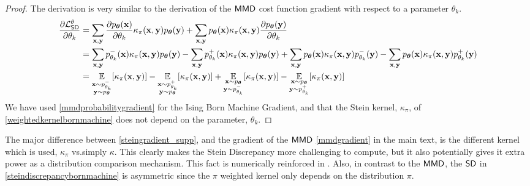 \begin{proof}
The derivation is very similar to the derivation of the $\operatorname{\textsf{MMD}}$ cost function gradient with respect to a parameter $\theta_k$.
\begin{align*}
    \frac{\partial \mathcal{L}^{\theta}_{\operatorname{\textsf{SD}}}}{\partial \theta_k} &= \sum\limits_{\mathbf{x}, \mathbf{y}} \frac{\partial p_{\boldsymbol\theta}(\mathbf{x})}{\partial \theta_k} \kappa_\pi(\mathbf{x}, \mathbf{y}) p_{\boldsymbol\theta}(\mathbf{y}) +  \sum\limits_{\mathbf{x}, \mathbf{y}} p_{\boldsymbol\theta}(\mathbf{x})\kappa_\pi(\mathbf{x}, \mathbf{y})   \frac{\partial p_{\boldsymbol\theta}(\mathbf{y})}{\partial \theta_k}\\
    &=  \sum\limits_{\mathbf{x}, \mathbf{y}}p^-_{\theta_k}(\mathbf{x})  \kappa_\pi(\mathbf{x}, \mathbf{y}) p_{\boldsymbol\theta}(\mathbf{y}) -  \sum\limits_{\mathbf{x}, \mathbf{y}}p^+_{\theta_k}(\mathbf{x})  \kappa_\pi(\mathbf{x}, \mathbf{y}) p_{\boldsymbol\theta}(\mathbf{y}) +\sum\limits_{\mathbf{x}, \mathbf{y}} p_{\boldsymbol\theta}(\mathbf{x})\kappa_\pi(\mathbf{x}, \mathbf{y})   p^-_{\theta_k}(\mathbf{y}) -  \sum\limits_{\mathbf{x}, \mathbf{y}} p_{\boldsymbol\theta}(\mathbf{x})\kappa_\pi(\mathbf{x}, \mathbf{y})p^+_{\theta_k}(\mathbf{y})\\
    & = \underset{\substack{\mathbf{x} \sim p^-_{\theta_k} \\ \mathbf{y}\sim p_{\boldsymbol\theta}}}{\mathbb{E}}[\kappa_\pi(\mathbf{x}, \mathbf{y})] - \underset{\substack{\mathbf{x} \sim p^+_{\theta_k} \\ \mathbf{y}\sim p_{\boldsymbol\theta}}}{\mathbb{E}}[\kappa_\pi(\mathbf{x}, \mathbf{y})] +\underset{\substack{\mathbf{x} \sim p_{\boldsymbol\theta}\\ \mathbf{y}\sim p^-_{\theta_k}}}{\mathbb{E}}[\kappa_\pi(\mathbf{x}, \mathbf{y})] - \underset{\substack{\mathbf{x} \sim p_{\boldsymbol\theta} \\ \mathbf{y}\sim p^+_{\theta_k}}}{\mathbb{E}}[\kappa_\pi(\mathbf{x}, \mathbf{y})]
\end{align*}
We have used \eqref{mmdprobabilitygradient} for the Ising Born Machine Gradient,  and that the Stein kernel, $\kappa_{\pi}$, of \eqref{weightedkernelbornmachine} does not depend on the parameter, ${\theta_k}$.

\end{proof}

The major difference between \eqref{steingradient_supp}, and the gradient of the $\operatorname{\textsf{MMD}}$ \eqref{mmdgradient} in the main text, is the different kernel which is used, $\kappa_\pi$ vs.\@ simply $\kappa$. This clearly makes the Stein Discrepancy more challenging to compute, but it also potentially gives it extra power as a distribution comparison mechanism. This fact is numerically reinforced in . Also, in contrast to the $\operatorname{\textsf{MMD}}$, the $\operatorname{\textsf{SD}}$ in \eqref{steindiscrepancybornmachine} is asymmetric since the $\pi$ weighted kernel only depends on the distribution $\pi$.

